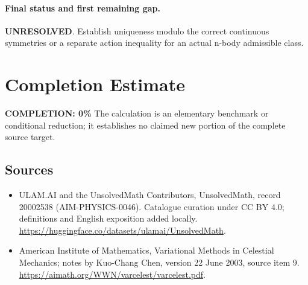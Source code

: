 \documentclass[11pt]{article}
\begin{document}
\paragraph{Final status and first remaining gap.}
\textbf{UNRESOLVED}. Establish uniqueness modulo the correct continuous symmetries or a separate action inequality for an actual n-body admissible class.

\section{Completion Estimate}
\noindent\textbf{COMPLETION: 0\%}
The calculation is an elementary benchmark or conditional reduction; it establishes no claimed new portion of the complete source target.

\subsection{Sources}
\begin{itemize}
\item[\hypertarget{source:20002538:1}{S1}] ULAM.AI and the UnsolvedMath Contributors, UnsolvedMath, record 20002538 (AIM-PHYSICS-0046). Catalogue curation under CC BY 4.0; definitions and English exposition added locally.
\url{https://huggingface.co/datasets/ulamai/UnsolvedMath}.
\item[\hypertarget{source:20002538:2}{S2}] American Institute of Mathematics, Variational Methods in Celestial Mechanics; notes by Kuo-Chang Chen, version 22 June 2003, source item 9.
\url{https://aimath.org/WWN/varcelest/varcelest.pdf}.
\end{itemize}
\label{end:20002538}
\end{document}
